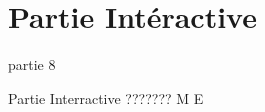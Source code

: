 \section{Partie Intéractive}

\begin{frame}{partie 8}
  \vspace{0.45cm}
  \begin{pointcle}
    \centering\large
    Partie Interractive ??????? M E
  \end{pointcle}
\end{frame}

